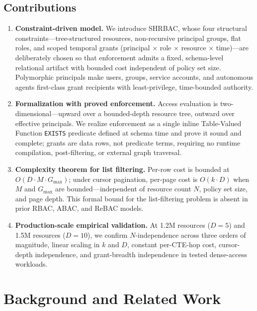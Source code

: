 \documentclass[conference]{IEEEtran}
\begin{document}
\subsection{Contributions}

\begin{enumerate}
\item \textbf{Constraint-driven model.} We introduce SHRBAC, whose four structural constraints---tree-structured resources, non-recursive principal groups, flat roles, and scoped temporal grants (principal $\times$ role $\times$ resource $\times$ time)---are deliberately chosen so that enforcement admits a fixed, schema-level relational artifact with bounded cost independent of policy set size. Polymorphic principals make users, groups, service accounts, and autonomous agents first-class grant recipients with least-privilege, time-bounded authority.

\item \textbf{Formalization with proved enforcement.} Access evaluation is two-dimensional---upward over a bounded-depth resource tree, outward over effective principals. We realize enforcement as a single inline Table-Valued Function \texttt{EXISTS} predicate defined at schema time and prove it sound and complete; grants are data rows, not predicate terms, requiring no runtime compilation, post-filtering, or external graph traversal.

\item \textbf{Complexity theorem for list filtering.} Per-row cost is bounded at $O(D \cdot M \cdot G_{\max})$; under cursor pagination, per-page cost is $O(k \cdot D)$ when $M$ and $G_{\max}$ are bounded---independent of resource count $N$, policy set size, and page depth. This formal bound for the list-filtering problem is absent in prior RBAC, ABAC, and ReBAC models.

\item \textbf{Production-scale empirical validation.} At 1.2M resources ($D{=}5$) and 1.5M resources ($D{=}10$), we confirm $N$-independence across three orders of magnitude, linear scaling in $k$ and $D$, constant per-CTE-hop cost, cursor-depth independence, and grant-breadth independence in tested dense-access workloads.
\end{enumerate}

\section{Background and Related Work}
\label{sec:related}
\end{document}
